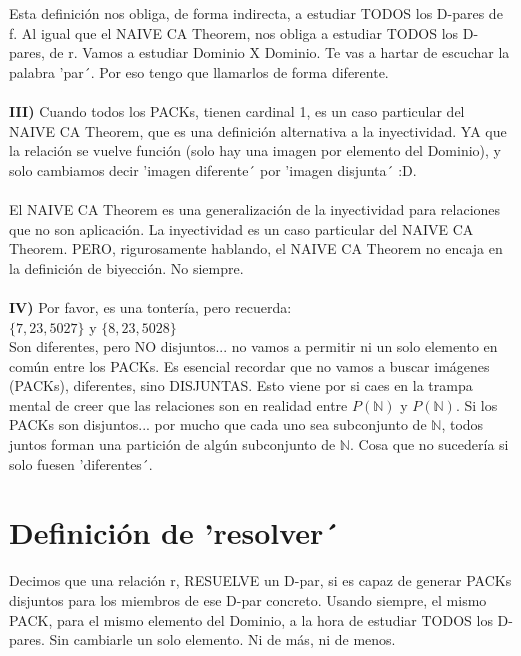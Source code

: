 	\noindent
	Esta definición nos obliga, de forma indirecta, a estudiar TODOS los D-pares de f. Al igual que el NAIVE CA Theorem, nos obliga a estudiar TODOS los D-pares, de r. Vamos a estudiar Dominio X Dominio. Te vas a hartar de escuchar la palabra 'par´. Por eso tengo que llamarlos de forma diferente.\\\\
	
	\noindent
	\textbf{III)} Cuando todos los PACKs, tienen cardinal 1, es un caso particular del NAIVE CA Theorem, que es una definición alternativa a la inyectividad. YA que la relación se vuelve función (solo hay una imagen por elemento del Dominio), y solo cambiamos decir 'imagen diferente´ por 'imagen disjunta´ :D.\\\\
	
	\noindent
	El NAIVE CA Theorem es una generalización de la inyectividad para relaciones que no son aplicación. La inyectividad es un caso particular del NAIVE CA Theorem. PERO, rigurosamente hablando, el NAIVE CA Theorem no encaja en la definición de biyección. No siempre.\\\\
	
	\noindent
	\textbf{IV)} Por favor, es una tontería, pero recuerda:\\
	$\{7, 23, 5027\}$ y $\{8, 23, 5028\}$\\
	Son diferentes, pero NO disjuntos... no vamos a permitir ni un solo elemento en común entre los PACKs. Es esencial recordar que no vamos a buscar imágenes (PACKs), diferentes, sino DISJUNTAS. Esto viene por si caes en la trampa mental de creer que las relaciones son en realidad entre $P(\mathbb{N})$ y $P(\mathbb{N})$. Si los PACKs son disjuntos... por mucho que cada uno sea subconjunto de $\mathbb{N}$, todos juntos forman una partición de algún subconjunto de $\mathbb{N}$. Cosa que no sucedería si solo fuesen 'diferentes´. 
	
	
	\section{Definición de 'resolver´}
	
	\noindent
	Decimos que una relación r, RESUELVE un D-par, si es capaz de generar PACKs disjuntos para los miembros de ese D-par concreto. Usando siempre, el mismo PACK, para el mismo elemento del Dominio, a la hora de estudiar TODOS los D-pares. Sin cambiarle un solo elemento. Ni de más, ni de menos.
	\\\\
	

